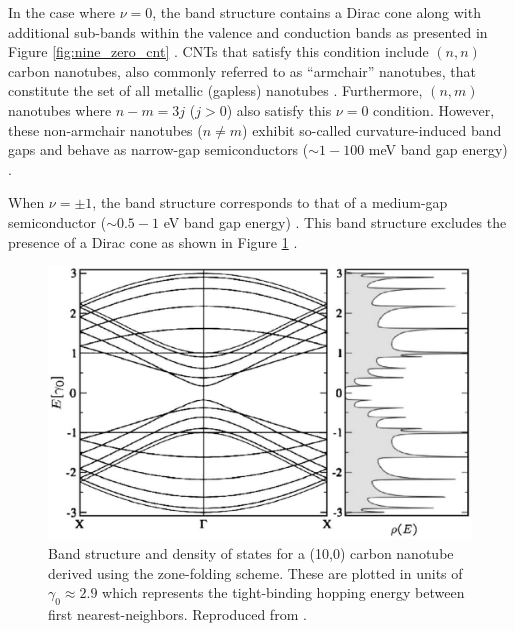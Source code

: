 In the case where $\nu = 0 $, the band structure contains a Dirac cone along with additional sub-bands within the valence and conduction bands as presented in Figure \ref{fig:nine_zero_cnt} . CNTs that satisfy this condition include $(n,n)$ carbon nanotubes, also commonly referred to as ``armchair'' nanotubes, that constitute the set of all metallic (gapless) nanotubes \cite{nanot2012optoelectronic}. Furthermore, $(n,m)$ nanotubes where $n-m = 3j$ ($j > 0$) also satisfy this $\nu = 0$ condition. However, these non-armchair nanotubes ($n\neq m$) exhibit so-called curvature-induced band gaps and behave as narrow-gap semiconductors ($\sim1 - 100$ meV band gap energy) \cite{nanot2012optoelectronic}. 

When $\nu= \pm 1$, the band structure corresponds to that of a medium-gap semiconductor ($\sim0.5 - 1$ eV band gap energy) \cite{nanot2012optoelectronic}. This band structure excludes the presence of a Dirac cone as shown in Figure \ref{fig:ten_zero_cnt}  \cite{charlier2007electronic}.
 


\begin{figure}[h]
	\centering
	\includegraphics[scale=0.38]{images/chapter_optical_props/ten_zero_band_charlier}
	\caption{Band structure and density of states for a (10,0) carbon nanotube derived using the zone-folding scheme. These are plotted in units of $\gamma_0 \approx 2.9$ which represents the tight-binding hopping energy between first nearest-neighbors. Reproduced from \cite{charlier2007electronic}.}
	\label{fig:ten_zero_cnt}
\end{figure}


